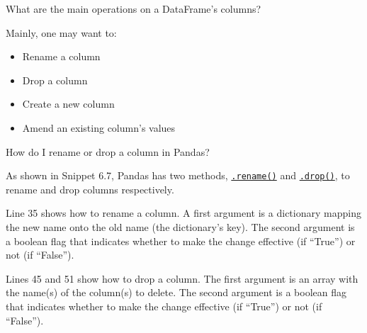 \documentclass[a4paper,11pt]{book}
\newcommand{\question}[1]{%
    \begin{tcolorbox}[colback=comp_c!10,colframe=comp_c,sidebyside align=top,width=\linewidth,before skip=1ex]
        #1
    \end{tcolorbox}
    \switchcolumn%
}
\newcommand{\note}[1]{%
    \begin{tcolorbox}[colback=white!0,colframe=white!10,width=\linewidth,before skip=1ex]
        #1
    \end{tcolorbox}
}
\begin{document}
\begin{paracol}{2}
	\question{\raggedright What are the main operations on a DataFrame's columns?}
	\note{Mainly, one may want to:
	\begin{itemize}
		\item Rename a column
		\item Drop a column
		\item Create a new column
		\item Amend an existing column's values
	\end{itemize}
	}
\end{paracol}

\begin{paracol}{2}
	\question{\raggedright How do I rename or drop a column in Pandas?}
	\note{As shown in Snippet 6.7, Pandas has two methods, \href{https://pandas.pydata.org/docs/reference/api/pandas.DataFrame.rename.html?highlight=rename#pandas.DataFrame.rename}{\texttt{.rename()}} and \href{https://pandas.pydata.org/docs/reference/api/pandas.DataFrame.drop.html?highlight=drop#pandas.DataFrame.drop}{\texttt{.drop()}}, to rename and drop columns respectively.

	\quad Line 35 shows how to rename a column. A first argument is a dictionary mapping the new name onto the old name (the dictionary's key). The second argument is a boolean flag that indicates whether to make the change effective (if ``True'') or not (if ``False'').

	\quad Lines 45 and 51 show how to drop a column. The first argument is an array with the name(s) of the column(s) to delete. The second argument is a boolean flag that indicates whether to make the change effective (if ``True'') or not (if ``False'').
	}	
\end{paracol}
\end{document}
